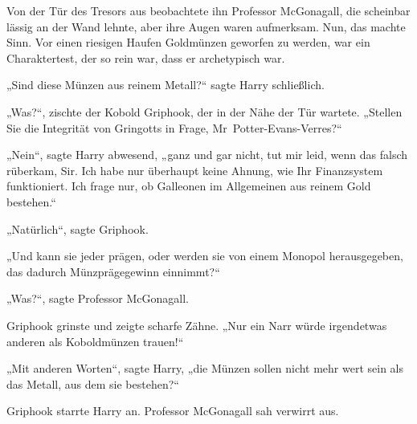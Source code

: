 Von der Tür des Tresors aus beobachtete ihn Professor McGonagall, die scheinbar lässig an der Wand lehnte, aber ihre Augen waren aufmerksam. Nun, das machte Sinn. Vor einen riesigen Haufen Goldmünzen geworfen zu werden, war ein Charaktertest, der so rein war, dass er archetypisch war.

„Sind diese Münzen aus reinem Metall?“ sagte Harry schließlich.

„Was?“, zischte der Kobold Griphook, der in der Nähe der Tür wartete. „Stellen Sie die Integrität von Gringotts in Frage, Mr~Potter-Evans-Verres?“

„Nein“, sagte Harry abwesend, „ganz und gar nicht, tut mir leid, wenn das falsch rüberkam, Sir. Ich habe nur überhaupt keine Ahnung, wie Ihr Finanzsystem funktioniert. Ich frage nur, ob Galleonen im Allgemeinen aus reinem Gold bestehen.“

„Natürlich“, sagte Griphook.

„Und kann sie jeder prägen, oder werden sie von einem Monopol herausgegeben, das dadurch Münzprägegewinn einnimmt?“

„Was?“, sagte Professor McGonagall.

Griphook grinste und zeigte scharfe Zähne. „Nur ein Narr würde irgendetwas anderen als Koboldmünzen trauen!“

„Mit anderen Worten“, sagte Harry, „die Münzen sollen nicht mehr wert sein als das Metall, aus dem sie bestehen?“

Griphook starrte Harry an. Professor McGonagall sah verwirrt aus.

